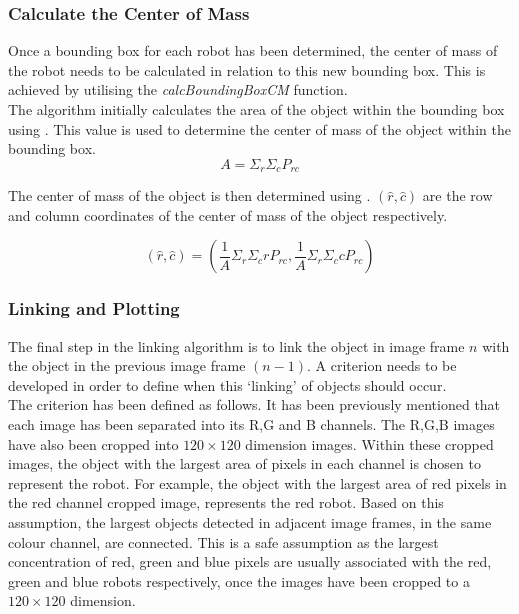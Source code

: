 \documentclass{article}
\begin{document}
\subsubsection{Calculate the Center of Mass}
\label{sec:cm}
Once a bounding box for each robot has been determined, the center of mass of the robot needs to be calculated in relation to this new bounding box. This is achieved by utilising the \textit{calcBoundingBoxCM} function.\\

The algorithm initially calculates the area of the object within the bounding box using . This value is used to determine the center of mass of the object within the bounding box.\\

\begin{equation}
A = \Sigma_{r}\Sigma_{c}P_{rc} 
\label{eqn:area}
\end{equation}

The center of mass of the object is then determined using . $(\widehat{r}, \widehat{c})$ are the row and column coordinates of the center of mass of the object respectively.

\begin{equation}
(\widehat{r}, \widehat{c}) = (\frac{1}{A}\Sigma_{r}\Sigma_{c}r P_{rc}, \frac{1}{A}\Sigma_{r}\Sigma_{c}c P_{rc}) 
\label{eqn:cm}
\end{equation}

\subsubsection{Linking and Plotting}
\label{sec:linkplot}
The final step in the linking algorithm is to link the object in image frame $n$ with the object in the previous image frame $(n-1)$. A criterion needs to be developed in order to define when this `linking' of objects should occur. \\

The criterion has been defined as follows. It has been previously mentioned that each image has been separated into its R,G and B channels. The R,G,B images have also been cropped into $120 \times 120$ dimension images. Within these cropped images, the object with the largest area of pixels in each channel is chosen to represent the robot. For example, the object with the largest area of red pixels in the red channel cropped image, represents the red robot. Based on this assumption, the largest objects detected in adjacent image frames, in the same colour channel, are connected. This is a safe assumption as the largest concentration of  red, green and blue pixels are usually associated with the red, green and blue robots respectively, once the images have been cropped to a $120 \times 120$ dimension. \\
\end{document}
